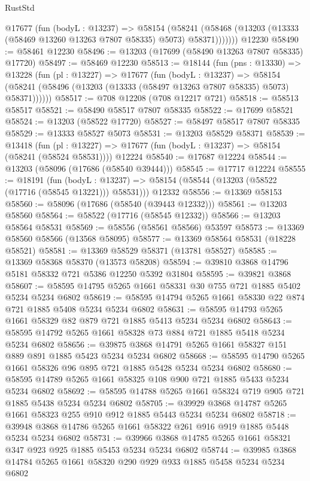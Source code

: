 \begin{lexlean}{RustStd}
\begin{coremodule}
        @17677
          (fun (bodyL : @13237) =>
          @58154
            (@58241 (@58468 (@13203 (@13333 (@58469 @13260 @13263 @7807 @58335) @5073) @58371)))))))
    @12230
@58490 := @58461 @12230
@58496 := @13203 (@17699 (@58490 @13263 @7807 @58335) @17720)
@58497 := @58469 @12230
@58513 := @18144
    (fun (pns : @13330) =>
    @13228
      (fun (pl : @13227) =>
      @17677
        (fun (bodyL : @13237) =>
        @58154 (@58241 (@58496 (@13203 (@13333 (@58497 @13263 @7807 @58335) @5073) @58371))))))
@58517 := @708 @12208 (@708 @12217 @721)
@58518 := @58513 @58517
@58521 := @58490 @58517 @7807 @58335
@58522 := @17699 @58521
@58524 := @13203 (@58522 @17720)
@58527 := @58497 @58517 @7807 @58335
@58529 := @13333 @58527 @5073
@58531 := @13203 @58529 @58371
@58539 := @13418
    (fun (pl : @13227) => @17677 (fun (bodyL : @13237) => @58154 (@58241 (@58524 @58531))))
    @12224
@58540 := @17687 @12224
@58544 := @13203 (@58096 (@17686 (@58540 @39444)))
@58545 := @17717 @12224
@58555 := @18191
    (fun (bodyL : @13237) => @58154 (@58544 (@13203 (@58522 (@17716 (@58545 @13221))) @58531)))
    @12332
@58556 := @13369 @58153
@58560 := @58096 (@17686 (@58540 (@39443 @12332)))
@58561 := @13203 @58560
@58564 := @58522 (@17716 (@58545 @12332))
@58566 := @13203 @58564 @58531
@58569 := @58556 (@58561 @58566) @53597
@58573 := @13369 @58560 @58566 (@13568 @58095)
@58577 := @13369 @58564 @58531 (@18228 @58521)
@58581 := @13369 @58529 @58371 (@13781 @58527)
@58585 := @13369 @58368 @58370 (@13573 @58208)
@58594 := @39810 @3868 @14796 @5181 @58332 @721 @5386 @12250 @5392 @31804
@58595 := @39821 @3868
@58607 := @58595 @14795 @5265 @1661 @58331 @30 @755 @721 @1885 @5402 @5234 @5234 @6802
@58619 := @58595 @14794 @5265 @1661 @58330 @22 @874 @721 @1885 @5408 @5234 @5234 @6802
@58631 := @58595 @14793 @5265 @1661 @58329 @82 @879 @721 @1885 @5413 @5234 @5234 @6802
@58643 := @58595 @14792 @5265 @1661 @58328 @73 @884 @721 @1885 @5418 @5234 @5234 @6802
@58656 := @39875 @3868 @14791 @5265 @1661 @58327 @151 @889 @891 @1885 @5423 @5234 @5234 @6802
@58668 := @58595 @14790 @5265 @1661 @58326 @96 @895 @721 @1885 @5428 @5234 @5234 @6802
@58680 := @58595 @14789 @5265 @1661 @58325 @108 @900 @721 @1885 @5433 @5234 @5234 @6802
@58692 := @58595 @14788 @5265 @1661 @58324 @719 @905 @721 @1885 @5438 @5234 @5234 @6802
@58705 := @39929 @3868 @14787 @5265 @1661 @58323 @255 @910 @912 @1885 @5443 @5234 @5234 @6802
@58718 := @39948 @3868 @14786 @5265 @1661 @58322 @261 @916 @919 @1885 @5448 @5234 @5234 @6802
@58731 := @39966 @3868 @14785 @5265 @1661 @58321 @347 @923 @925 @1885 @5453 @5234 @5234 @6802
@58744 := @39985 @3868 @14784 @5265 @1661 @58320 @290 @929 @933 @1885 @5458 @5234 @5234 @6802

\end{coremodule}
\end{lexlean}

